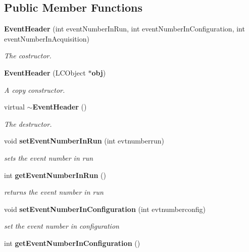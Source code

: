 \subsection*{Public Member Functions}
\begin{DoxyCompactItemize}
\item 
{\bf Event\-Header} (int event\-Number\-In\-Run, int event\-Number\-In\-Configuration, int event\-Number\-In\-Acquisition)\label{classCALICE_1_1EventHeader_a61ce4e0faf985f2d70f92c314eb3033a}

\begin{DoxyCompactList}\small\item\em The costructor. \end{DoxyCompactList}\item 
{\bf Event\-Header} (L\-C\-Object $\ast${\bf obj})\label{classCALICE_1_1EventHeader_a211f090b7c628659f5ea559fde21d95b}

\begin{DoxyCompactList}\small\item\em A copy constructor. \end{DoxyCompactList}\item 
virtual {\bf $\sim$\-Event\-Header} ()\label{classCALICE_1_1EventHeader_a2e907c74e6642601f41270e5c8d88c17}

\begin{DoxyCompactList}\small\item\em The destructor. \end{DoxyCompactList}\item 
void {\bf set\-Event\-Number\-In\-Run} (int evtnumberrun)\label{classCALICE_1_1EventHeader_ab962056e1ab5c7f89184c484b495955e}

\begin{DoxyCompactList}\small\item\em sets the event number in run \end{DoxyCompactList}\item 
int {\bf get\-Event\-Number\-In\-Run} ()\label{classCALICE_1_1EventHeader_a8f50d11349a3b8d497762ac1cae27d44}

\begin{DoxyCompactList}\small\item\em returns the event number in run \end{DoxyCompactList}\item 
void {\bf set\-Event\-Number\-In\-Configuration} (int evtnumberconfig)\label{classCALICE_1_1EventHeader_a6c40f09937e882ab0f178eee8453ad03}

\begin{DoxyCompactList}\small\item\em set the event number in configuration \end{DoxyCompactList}\item 
int {\bf get\-Event\-Number\-In\-Configuration} ()\label{classCALICE_1_1EventHeader_ac0d6b7781caddb323548dba760c2cd21}


\end{DoxyCompactItemize}

